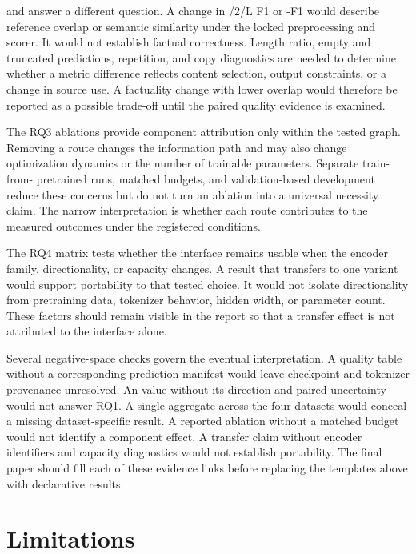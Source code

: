 \Rouge and \BERTScore answer a different question.  A change in /2/L
F1 or \BERTScore-F1 would describe reference overlap or semantic similarity
under the locked preprocessing and scorer.  It would not establish factual
correctness.  Length ratio, empty and truncated predictions, repetition, and
copy diagnostics are needed to determine whether a metric difference reflects
content selection, output constraints, or a change in source use.  A factuality
change with lower overlap would therefore be reported as a possible trade-off
until the paired quality evidence is examined.

The RQ3 ablations provide component attribution only within the tested \EviSeq graph.
Removing a route changes the information path and may also change optimization
dynamics or the number of trainable parameters.  Separate train-from-
pretrained runs, matched budgets, and validation-based development reduce
these concerns but do not turn an ablation into a universal necessity claim.
The narrow interpretation is whether each route contributes to the measured
outcomes under the registered conditions.

The RQ4 matrix tests whether the interface remains usable when the encoder
family, directionality, or capacity changes.  A result that transfers to one
variant would support portability to that tested choice.  It would not isolate
directionality from pretraining data, tokenizer behavior, hidden width, or
parameter count.  These factors should remain visible in the report so that a
transfer effect is not attributed to the \AFMR interface alone.

Several negative-space checks govern the eventual interpretation.  A quality
table without a corresponding prediction manifest would leave checkpoint and
tokenizer provenance unresolved.  An \AlignScore value without its direction
and paired uncertainty would not answer RQ1.  A single aggregate across the
four datasets would conceal a missing dataset-specific result.  A reported
ablation without a matched budget would not identify a component effect.  A
transfer claim without encoder identifiers and capacity diagnostics would not
establish portability.  The final paper should fill each of these evidence
links before replacing the templates above with declarative results.

\section{Limitations}
\label{sec:limitations}

